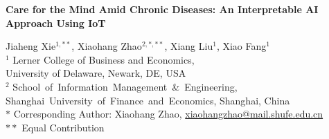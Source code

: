 \documentclass[mnsc]{informs3b} %
\begin{document}
\begin{center}
\textbf{\Large Care for the Mind Amid Chronic Diseases: An Interpretable AI Approach Using IoT}    
\end{center}

\hspace{0.2cm}
\begin{center}

Jiaheng Xie$^{1,**}$, Xiaohang Zhao$^{2,*,**}$, Xiang Liu$^{1}$, Xiao Fang$^{1}$ \\
\vspace{0.2cm}
$^1$ Lerner College of Business and Economics, \\
University of Delaware, Newark, DE, USA \\

$^2$ School of Information Management \& Engineering, \\ Shanghai University of Finance and Economics, Shanghai, China \\

\vspace{0.1cm}
$*$ Corresponding Author: Xiaohang Zhao, \href{mailto:xiaohangzhao@mail.shufe.edu.cn}{xiaohangzhao@mail.shufe.edu.cn} \\
$**$ Equal Contribution \\
\end{center}
\vspace{0.3cm}
\end{document}
